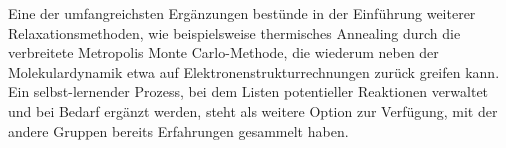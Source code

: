 Eine der umfangreichsten Ergänzungen bestünde in der Einführung weiterer Relaxationsmethoden, wie beispielsweise thermisches Annealing durch die verbreitete Metropolis Monte Carlo-Methode, die wiederum neben der Molekulardynamik etwa auf Elektronenstrukturrechnungen zurück greifen kann.
Ein selbst-lernender Prozess, bei dem Listen potentieller Reaktionen verwaltet und bei Bedarf ergänzt werden, steht als weitere Option zur Verfügung, mit der andere Gruppen bereits Erfahrungen gesammelt haben.

